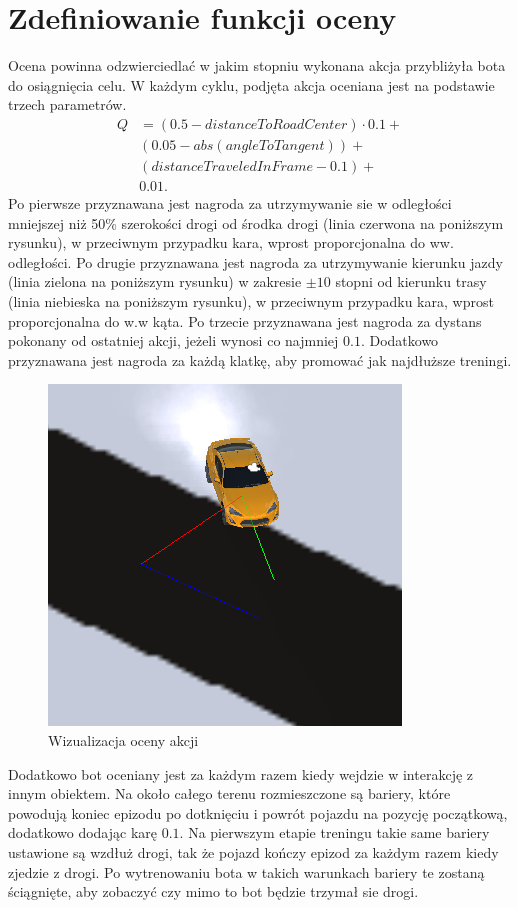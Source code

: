 \section{Zdefiniowanie funkcji oceny}
Ocena powinna odzwierciedlać w jakim stopniu wykonana akcja przybliżyła bota do osiągnięcia celu. W każdym cyklu, podjęta akcja oceniana jest na podstawie trzech parametrów.
\begin{align*}
    Q &= (0.5 - distanceToRoadCenter) \cdot 0.1 + \\
    & (0.05 - abs(angleToTangent)) + \\
    & (distanceTraveledInFrame - 0.1) + \\
    & 0.01.
\end{align*}
Po pierwsze przyznawana jest nagroda za utrzymywanie sie w odległości mniejszej niż 50\% szerokości drogi od środka drogi (linia czerwona na poniższym rysunku), w przeciwnym przypadku kara, wprost proporcjonalna do ww. odległości. Po drugie przyznawana jest nagroda za utrzymywanie kierunku jazdy (linia zielona na poniższym rysunku) w zakresie $\pm10$ stopni od kierunku trasy (linia niebieska na poniższym rysunku), w przeciwnym przypadku kara, wprost proporcjonalna do w.w kąta. Po trzecie przyznawana jest nagroda za dystans pokonany od ostatniej akcji, jeżeli wynosi co najmniej $0.1$. Dodatkowo przyznawana jest nagroda za każdą klatkę, aby promować jak najdłuższe treningi.
\begin{figure}[H]
    \centering
    \includegraphics[width=.5\textwidth]{figures/rewards}
    \caption{Wizualizacja oceny akcji}
    \label{fig}
\end{figure}
Dodatkowo bot oceniany jest za każdym razem kiedy wejdzie w interakcję z innym obiektem. Na około całego terenu rozmieszczone są bariery, które powodują koniec epizodu po dotknięciu i powrót pojazdu na pozycję początkową, dodatkowo dodając karę $0.1$. Na pierwszym etapie treningu takie same bariery ustawione są wzdłuż drogi, tak że pojazd kończy epizod za każdym razem kiedy zjedzie z drogi. Po wytrenowaniu bota w takich warunkach bariery te zostaną ściągnięte, aby zobaczyć czy mimo to bot będzie trzymał sie drogi.\\
